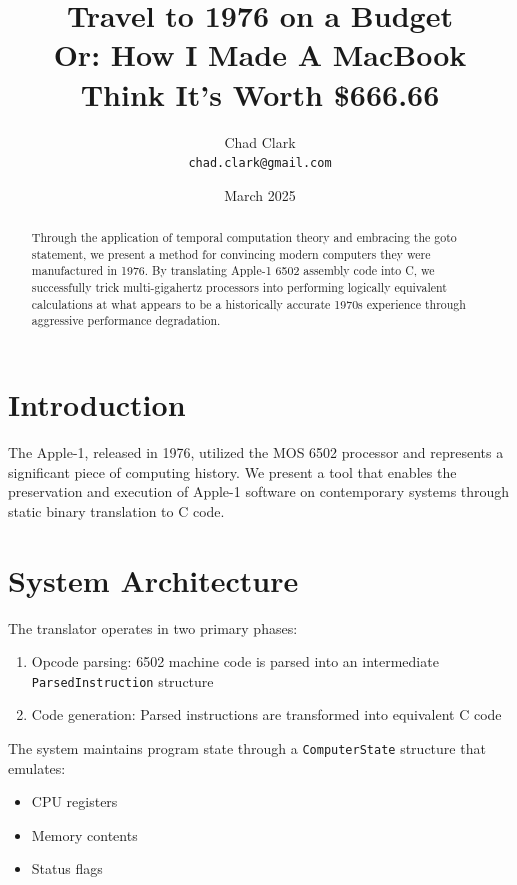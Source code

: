 \documentclass[10pt,twocolumn]{article}
\begin{document}
\title{Travel to 1976 on a Budget\\
\small{Or: How I Made A MacBook Think It's Worth \$666.66}}

\author{Chad Clark\\
\texttt{chad.clark@gmail.com}}

\date{March 2025}

\maketitle

\begin{abstract}
Through the application of temporal computation theory and embracing the goto statement, we present a method for convincing modern computers they were manufactured in 1976. By translating Apple-1 6502 assembly code into C, we successfully trick multi-gigahertz processors into performing logically equivalent calculations at what appears to be a historically accurate 1970s experience through aggressive performance degradation.
\end{abstract}


\section{Introduction}
The Apple-1, released in 1976, utilized the MOS 6502 processor and represents a significant piece of computing history. We present a tool that enables the preservation and execution of Apple-1 software on contemporary systems through static binary translation to C code.

\section{System Architecture}
The translator operates in two primary phases:
\begin{enumerate}
    \item Opcode parsing: 6502 machine code is parsed into an intermediate \texttt{ParsedInstruction} structure
    \item Code generation: Parsed instructions are transformed into equivalent C code
\end{enumerate}

The system maintains program state through a \texttt{ComputerState} structure that emulates:
\begin{itemize}
    \item CPU registers
    \item Memory contents
    \item Status flags
\end{itemize}
\end{document}
